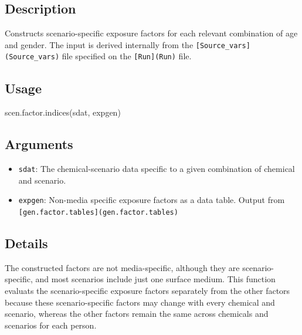 \documentclass[
]{article}
\newenvironment{Shaded}{\begin{snugshade}}{\end{snugshade}}
\newcommand{\FunctionTok}[1]{\textcolor[rgb]{0.00,0.00,0.00}{#1}}
\newcommand{\NormalTok}[1]{#1}
\providecommand{\tightlist}{%
  \setlength{\itemsep}{0pt}\setlength{\parskip}{0pt}}
\begin{document}
\hypertarget{description-48}{%
\subsection{Description}\label{description-48}}

Constructs scenario-specific exposure factors for each relevant
combination of age and gender. The input is derived internally from the
\texttt{{[}Source\_vars{]}(Source\_vars)} file specified on the
\texttt{{[}Run{]}(Run)} file.

\hypertarget{usage-48}{%
\subsection{Usage}\label{usage-48}}

\begin{Shaded}
\begin{Highlighting}[]
\FunctionTok{scen.factor.indices}\NormalTok{(sdat, expgen)}
\end{Highlighting}
\end{Shaded}

\hypertarget{arguments-33}{%
\subsection{Arguments}\label{arguments-33}}

\begin{itemize}
\tightlist
\item
  \texttt{sdat}: The chemical-scenario data specific to a given
  combination of chemical and scenario.
\item
  \texttt{expgen}: Non-media specific exposure factors as a data table.
  Output from \texttt{{[}gen.factor.tables{]}(gen.factor.tables)}
\end{itemize}

\hypertarget{details-26}{%
\subsection{Details}\label{details-26}}

The constructed factors are not media-specific, although they are
scenario-specific, and most scenarios include just one surface medium.
This function evaluats the scenario-specific exposure factors separately
from the other factors because these scenario-specific factors may
change with every chemical and scenario, whereas the other factors
remain the same across chemicals and scenarios for each person.
\end{document}
